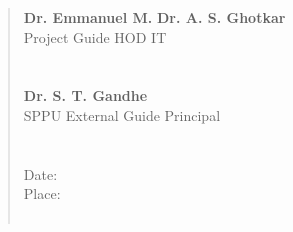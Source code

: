 \documentclass[12pt,a4paper]{report}     %
\begin{document}
\begin{quote}
\singlespace
\textbf{Dr. Emmanuel M.} %
\hspace{2.2 in} \textbf{Dr. A. S. Ghotkar}\\
Project Guide\hspace{3.2 in}       HOD IT \\\\\\

\textbf{} %
\hspace{3.7in} \textbf{Dr. S. T. Gandhe}\\
SPPU External Guide\hspace{2.6in}       Principal \\\\\\

Date:       \\ %
Place:       %
\\\\


 \end{quote}
\end{document}
